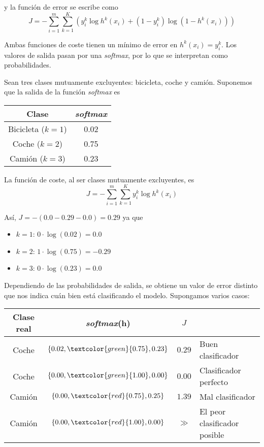\noindent y la función de error se escribe como 
\begin{equation}
J = -\sum_{i = 1}^m \sum_{k = 1}^K \left(y_i^k \log h^k(x_i) + (1 - y_i^k) \log (1 - h^k(x_i))\right)
\end{equation}

Ambas funciones de coste tienen un mínimo de error en $h^k(x_i) = y_i^k$. Los valores de salida pasan por una \textit{softmax}, por lo que se interpretan como probabilidades.

\begin{example}
Sean tres clases mutuamente excluyentes: bicicleta, coche y camión. Suponemos que la salida de la función \textit{softmax} es 
\begin{table}[H]
\centering
\begin{tabular}{cc}
\hline \hline
Clase & \textit{softmax} \\ \hline \hline
Bicicleta ($k = 1$) & 0.02 \\
Coche ($k = 2$) & 0.75 \\
Camión ($k = 3$) & 0.23 \\ \hline
\end{tabular}
\end{table}

\noindent La función de coste, al ser clases mutuamente excluyentes, es
\begin{equation}
J = -\sum_{i = 1}^m \sum_{k = 1}^K y_i^k \log h^k(x_i)
\end{equation}

\noindent Así, $J = - (0.0 - 0.29 - 0.0) = 0.29$ ya que  
\begin{itemize}
\item $k = 1$: $0 \cdot \log (0.02) = 0.0$
\item $k = 2$: $1 \cdot \log (0.75) = -0.29$
\item $k = 3$: $0 \cdot \log (0.23) = 0.0$
\end{itemize}

Dependiendo de las probabilidades de salida, se obtiene un valor de error distinto que nos indica cuán bien está clasificando el modelo. Supongamos varios casos:
\begin{table}[H]
\centering
\begin{tabular}{cccl}
\hline \hline
Clase real & \textit{softmax}(h) & $J$ &  \\ \hline \hline
Coche & $\{0.02, \textcolor{green}{0.75}, 0.23\}$ & $0.29$ & Buen clasificador \\
Coche & $\{0.00, \textcolor{green}{1.00}, 0.00\}$ & $0.00$ & Clasificador perfecto \\
Camión & $\{0.00, \textcolor{red}{0.75}, 0.25\}$ & $1.39$ & Mal clasificador \\
Camión & $\{0.00, \textcolor{red}{1.00}, 0.00\}$ & $\gg$ & El peor clasificador posible \\
\end{tabular}
\end{table}
\end{example}

